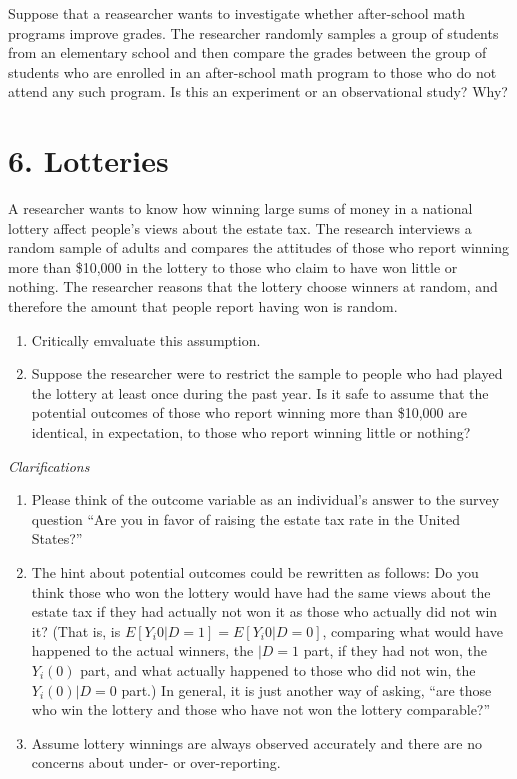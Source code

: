 \documentclass[]{article}
\providecommand{\tightlist}{%
  \setlength{\itemsep}{0pt}\setlength{\parskip}{0pt}}
\begin{document}
Suppose that a reasearcher wants to investigate whether after-school
math programs improve grades. The researcher randomly samples a group of
students from an elementary school and then compare the grades between
the group of students who are enrolled in an after-school math program
to those who do not attend any such program. Is this an experiment or an
observational study? Why?

\section{6. Lotteries}\label{lotteries}

A researcher wants to know how winning large sums of money in a national
lottery affect people's views about the estate tax. The research
interviews a random sample of adults and compares the attitudes of those
who report winning more than \$10,000 in the lottery to those who claim
to have won little or nothing. The researcher reasons that the lottery
choose winners at random, and therefore the amount that people report
having won is random.

\begin{enumerate}
\def\labelenumi{\alph{enumi}.}
\tightlist
\item
  Critically emvaluate this assumption.
\item
  Suppose the researcher were to restrict the sample to people who had
  played the lottery at least once during the past year. Is it safe to
  assume that the potential outcomes of those who report winning more
  than \$10,000 are identical, in expectation, to those who report
  winning little or nothing?
\end{enumerate}

\emph{Clarifications}

\begin{enumerate}
\def\labelenumi{\arabic{enumi}.}
\tightlist
\item
  Please think of the outcome variable as an individual's answer to the
  survey question ``Are you in favor of raising the estate tax rate in
  the United States?''
\item
  The hint about potential outcomes could be rewritten as follows: Do
  you think those who won the lottery would have had the same views
  about the estate tax if they had actually not won it as those who
  actually did not win it? (That is, is
  \(E[Y_{i}0|D=1] = E[Y_{i}0|D=0]\), comparing what would have happened
  to the actual winners, the \(|D=1\) part, if they had not won, the
  \(Y_{i}(0)\) part, and what actually happened to those who did not
  win, the \(Y_{i}(0)|D=0\) part.) In general, it is just another way of
  asking, ``are those who win the lottery and those who have not won the
  lottery comparable?''
\item
  Assume lottery winnings are always observed accurately and there are
  no concerns about under- or over-reporting.
\end{enumerate}
\end{document}
